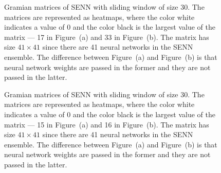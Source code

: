 \documentclass[conference]{IEEEtran}
\begin{document}
		\begin{figure}[thb]
			\centering
			\caption{Gramian matrices of SENN with sliding window of size 30. The matrices are represented as heatmaps, where the color white indicates a value of 0 and the color black is the largest value of the matrix --- 17 in Figure~(a) and 33 in Figure~(b). The matrix has size $41 \times 41$ since there are 41 neural networks in the SENN ensemble. The difference between Figure~(a) and Figure~(b) is that neural network weights are passed in the former and they are not passed in the latter.}
			\label{fig:gram-L30}%
		\end{figure}

		\begin{figure}[thb]
			\centering
			\caption{Gramian matrices of SENN with sliding window of size 30. The matrices are represented as heatmaps, where the color white indicates a value of 0 and the color black is the largest value of the matrix --- 15 in Figure~(a) and 16 in Figure~(b). The matrix has size $41 \times 41$ since there are 41 neural networks in the SENN ensemble. The difference between Figure~(a) and Figure~(b) is that neural network weights are passed in the former and they are not passed in the latter.}
			\label{fig:gram-L50}%
		\end{figure}
		
		
		
		
		
\end{document}
